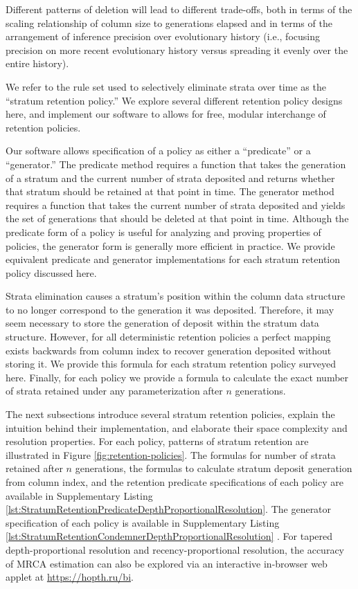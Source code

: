 Different patterns of deletion will lead to different trade-offs, both in terms of the scaling relationship of column size to generations elapsed and in terms of the arrangement of inference precision over evolutionary history (i.e., focusing precision on more recent evolutionary history versus spreading it evenly over the entire history).

We refer to the rule set used to selectively eliminate strata over time as the ``stratum retention policy.''
We explore several different retention policy designs here, and implement our software to allows for free, modular interchange of retention policies.

Our software allows specification of a policy as either a ``predicate'' or a ``generator.''
The predicate method requires a function that takes the generation of a stratum and the current number of strata deposited and returns whether that stratum should be retained at that point in time.
The generator method requires a function that takes the current number of strata deposited and yields the set of generations that should be deleted at that point in time.
Although the predicate form of a policy is useful for analyzing and proving properties of policies, the generator form is generally more efficient in practice.
We provide equivalent predicate and generator implementations for each stratum retention policy discussed here.

Strata elimination causes a stratum's position within the column data structure to no longer correspond to the generation it was deposited.
Therefore, it may seem necessary to store the generation of deposit within the stratum data structure.
However, for all deterministic retention policies a perfect mapping exists backwards from column index to recover generation deposited without storing it.
We provide this formula for each stratum retention policy surveyed here.
Finally, for each policy we provide a formula to calculate the exact number of strata retained under any parameterization after $n$ generations.

The next subsections introduce several stratum retention policies, explain the intuition behind their implementation, and elaborate their space complexity and resolution properties.
For each policy, patterns of stratum retention are illustrated in Figure \ref{fig:retention-policies}.
The formulas for number of strata retained after $n$ generations, the formulas to calculate stratum deposit generation from column index, and the retention predicate specifications of each policy are available in Supplementary Listing \ref{lst:StratumRetentionPredicateDepthProportionalResolution}.
The generator specification of each policy is available in Supplementary Listing \ref{lst:StratumRetentionCondemnerDepthProportionalResolution} \citep{moreno2022hstratconceptsupplement}.
For tapered depth-proportional resolution and recency-proportional resolution, the accuracy of MRCA estimation can also be explored via an interactive in-browser web applet at \url{https://hopth.ru/bi}.

